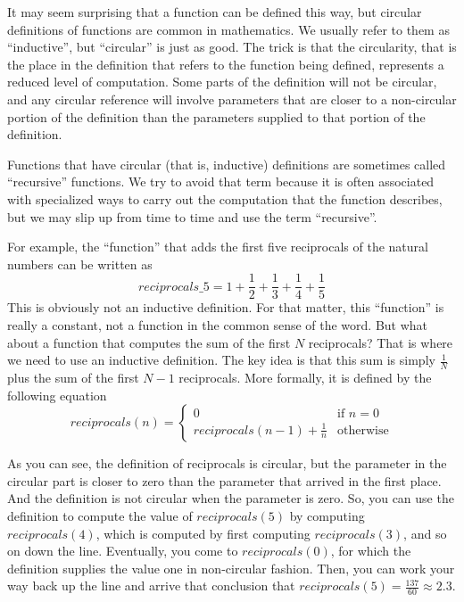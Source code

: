 It may seem surprising that a function can be defined this
way, but circular definitions of functions are common in mathematics.
We usually refer to them as ``inductive'', but ``circular'' is just as good.
The trick is that the circularity, that is the place in the definition that
refers to the function being defined, represents a reduced level of computation.
Some parts of the definition will not be circular, and any circular reference
will involve parameters that are closer to a non-circular portion of the
definition than the parameters supplied to that portion of the definition.

Functions that have circular (that is, inductive) definitions are sometimes
called ``recursive'' functions. We try to avoid that term because it is
often associated with specialized ways to carry out the computation
that the function describes, but we may slip up from time to time and use the term ``recursive''.

For example, the ``function'' that adds the first five reciprocals of the
natural numbers can be written as
\begin{displaymath}
reciprocals\_5 = 1 + \frac{1}{2} + \frac{1}{3} + \frac{1}{4} +
        \frac{1}{5}
\end{displaymath}
This is obviously not an inductive definition.  For that matter, this
``function'' is really a constant, not a function in the common sense
of the word.  But what about a function that computes the sum of the
first $N$ reciprocals?  That is where we need to use an inductive
definition.  The key idea is that this sum is simply $\frac{1}{N}$
plus the sum of the first $N-1$ reciprocals.  More formally, it is
defined by the following equation
\label{reciprocalsdef}
\begin{displaymath}
reciprocals(n) =
\left\{
        \begin{array}{ll}
                0                               & \mbox{if } n = 0 \\
                reciprocals (n-1) + \frac{1}{n} & \mbox{otherwise}
        \end{array}
\right.
\end{displaymath}

As you can see, the definition of reciprocals is circular, but the parameter
in the circular part is closer to zero than the parameter that arrived in the
first place. And the definition is not circular when the parameter is zero.
So, you can use the definition to compute the value of
        $reciprocals(5)$ by computing $reciprocals(4)$, which is
        computed by first computing $reciprocals(3)$, and so on down
        the line.  Eventually, you come to $reciprocals(0)$, for which
        the definition supplies the value one in non-circular
        fashion.
Then, you can work your way back up the line and arrive that
        conclusion that $reciprocals(5) = \frac{137}{60} \approx 2.3$.

